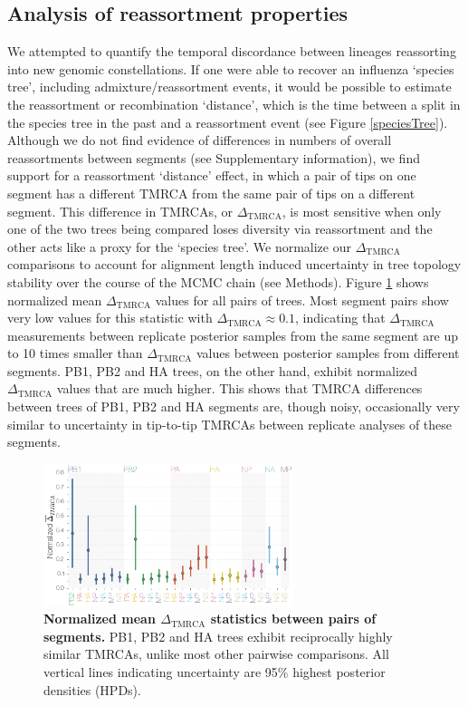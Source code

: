 \documentclass[11pt,oneside,letterpaper]{article}
\newcommand{\dtmrca}{\Delta_\mathrm{TMRCA}}
\begin{document}
\subsection*{Analysis of reassortment properties}
We attempted to quantify the temporal discordance between lineages reassorting into new genomic constellations.
If one were able to recover an influenza `species tree', including admixture/reassortment events, it would be possible to estimate the reassortment or recombination `distance', which is the time between a split in the species tree in the past and a reassortment event (see Figure \ref{speciesTree}).
Although we do not find evidence of differences in numbers of overall reassortments between segments (see Supplementary information), we find support for a reassortment `distance' effect, in which a pair of tips on one segment has a different TMRCA from the same pair of tips on a different segment.
This difference in TMRCAs, or $\dtmrca$, is most sensitive when only one of the two trees being compared loses diversity via reassortment and the other acts like a proxy for the `species tree'.
We normalize our $\dtmrca$ comparisons to account for alignment length induced uncertainty in tree topology stability over the course of the MCMC chain (see Methods).
Figure \ref{deltaTMRCA} shows normalized mean $\dtmrca$ values for all pairs of trees.
Most segment pairs show very low values for this statistic with $\dtmrca \approx 0.1$, indicating that $\dtmrca$ measurements between replicate posterior samples from the same segment are up to 10 times smaller than $\dtmrca$ values between posterior samples from different segments.
PB1, PB2 and HA trees, on the other hand, exhibit normalized $\dtmrca$ values that are much higher.
This shows that TMRCA differences between trees of PB1, PB2 and HA segments are, though noisy, occasionally very similar to uncertainty in tip-to-tip TMRCAs between replicate analyses of these segments.

\begin{figure}[h]
	\centering		
	\includegraphics[width=0.65\textwidth]{figures/InfB_normalizedMuDeltaTMRCA.png}
	\caption{\textbf{Normalized mean $\dtmrca$ statistics between pairs of segments.}
PB1, PB2 and HA trees exhibit reciprocally highly similar TMRCAs, unlike most other pairwise comparisons.
All vertical lines indicating uncertainty are 95\% highest posterior densities (HPDs).}
	\label{deltaTMRCA}
\end{figure}
\end{document}
